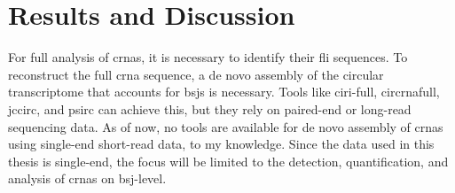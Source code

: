 \chapter{Results and Discussion}

For full analysis of \glspl{crna}, it is necessary to identify their \gls{fli}
sequences.
To reconstruct the full \gls{crna} sequence, a de novo assembly of the circular
transcriptome that accounts for \glspl{bsj} is necessary.
Tools like \gls{ciri-full}, \gls{circrnafull}, \gls{jccirc}, and \gls{psirc}
can achieve this, but they rely on paired-end or long-read sequencing data.
As of now, no tools are available for de novo assembly of \glspl{crna} using
single-end short-read data, to my knowledge.
Since the data used in this thesis is single-end, the focus will be limited to
the detection, quantification, and analysis of \glspl{crna} on \gls{bsj}-level.




%

